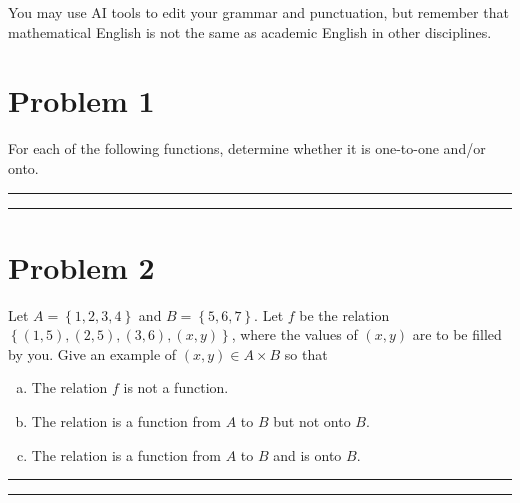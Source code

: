 \documentclass{article}
\theoremstyle{definition}
\newenvironment{solution}{\bigskip\hrule{\hfill}}{\bigskip\hrule{\hfill}} %
\begin{document}
You may use AI tools to edit your grammar and punctuation, but remember that mathematical English is not the same as academic English in other disciplines. 

\vfill

\newpage


\section*{Problem 1}
For each of the following functions, determine whether it is one-to-one and/or onto. 
\begin{solution}


\end{solution}


\newpage


\section*{Problem 2}
Let $A=\left\{1,2,3,4\right\}$ and $B=\left\{5,6,7\right\}$. Let $f$ be the relation $\left\{\left(1,5\right),\left(2,5\right),\left(3,6\right),\left(x,y\right)\right\}$, where the values of $\left(x,y\right)$ are to be filled by you. Give an example of $\left(x,y\right)\in A\times B$ so that
\begin{enumerate}[a)] %
    \item The relation $f$ is not a function.
    \item The relation is a function from $A$ to $B$ but not onto $B$.
    \item The relation is a function from $A$ to $B$ and is onto $B$.
\end{enumerate}
\begin{solution}


\end{solution}
\end{document}
